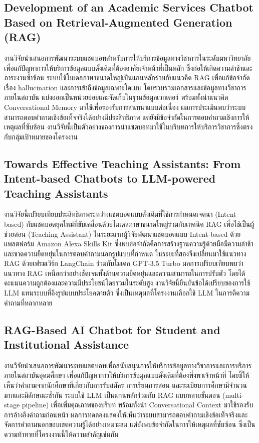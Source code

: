 \subsection{Development of an Academic Services Chatbot Based on Retrieval-Augmented Generation (RAG) \cite{academicChatbotRAG}}

งานวิจัยนำเสนอการพัฒนาระบบแชตบอทสำหรับการให้บริการข้อมูลทางวิชาการในระดับมหาวิทยาลัย เพื่อแก้ปัญหาการให้บริการข้อมูลแบบดั้งเดิมที่ต้องอาศัยเจ้าหน้าที่เป็นหลัก ซึ่งก่อให้เกิดความล่าช้าและภาระงานซ้ำซ้อน ระบบใช้โมเดลภาษาขนาดใหญ่เป็นแกนหลักร่วมกับแนวคิด RAG เพื่อแก้ข้อจำกัดเรื่อง hallucination และการเข้าถึงข้อมูลเฉพาะโดเมน โดยรวบรวมเอกสารและข้อมูลทางวิชาการภายในสถาบัน แบ่งออกเป็นหน่วยย่อยและจัดเก็บในฐานข้อมูลเวกเตอร์ พร้อมทั้งนำแนวคิด Conversational Memory มาใช้เพื่อรองรับการสนทนาแบบต่อเนื่อง ผลการประเมินพบว่าระบบสามารถตอบคำถามเชิงข้อเท็จจริงได้อย่างมีประสิทธิภาพ แต่ยังมีข้อจำกัดในการตอบคำถามเชิงการให้เหตุผลที่ซับซ้อน งานวิจัยนี้เป็นตัวอย่างของการนำแชตบอทมาใช้ในบริบทการให้บริการวิชาการซึ่งตรงกับกลุ่มเป้าหมายของโครงงาน

\subsection{Towards Effective Teaching Assistants: From Intent-based Chatbots to LLM-powered Teaching Assistants \cite{teachingAssistantsLLM}}

งานวิจัยนี้เปรียบเทียบประสิทธิภาพระหว่างแชตบอตแบบดั้งเดิมที่ใช้การกำหนดเจตนา (Intent-based) กับแชตบอตยุคใหม่ที่ขับเคลื่อนด้วยโมเดลภาษาขนาดใหญ่ร่วมกับเทคนิค RAG เพื่อใช้เป็นผู้ช่วยสอน (Teaching Assistant) ในระยะแรกผู้วิจัยพัฒนาแชตบอตแบบ Intent-based ด้วยแพลตฟอร์ม Amazon Alexa Skills Kit ซึ่งพบข้อจำกัดคือการสร้างฐานความรู้ด้วยมือมีความล่าช้าและขาดความยืดหยุ่นในการตอบคำถามนอกรูปแบบที่กำหนด ในระยะที่สองจึงเปลี่ยนมาใช้แนวทาง RAG ด้วยเฟรมเวิร์ก LangChain ร่วมกับโมเดล GPT-3.5 Turbo ผลการเปรียบเทียบพบว่าแนวทาง RAG เหนือกว่าอย่างชัดเจนทั้งด้านความยืดหยุ่นและความสามารถในการปรับตัว โดยได้คะแนนความถูกต้องและความมีประโยชน์โดยรวมในระดับสูง งานวิจัยนี้ยืนยันข้อได้เปรียบของการใช้ LLM แทนระบบที่อิงรูปแบบประโยคตายตัว ซึ่งเป็นเหตุผลที่โครงงานเลือกใช้ LLM ในการตีความคำถามที่หลากหลาย

\subsection{RAG-Based AI Chatbot for Student and Institutional Assistance \cite{ragStudentInstitutional}}

งานวิจัยนำเสนอการพัฒนาระบบแชตบอทเพื่อสนับสนุนการให้บริการข้อมูลทางวิชาการและการบริการภายในสถาบันอุดมศึกษา เพื่อแก้ปัญหาการให้บริการข้อมูลแบบดั้งเดิมที่ต้องพึ่งพาเจ้าหน้าที่ โดยชี้ให้เห็นว่าคำถามจากนักศึกษาที่เกี่ยวกับการรับสมัคร การเรียนการสอน และระเบียบการศึกษามีจำนวนมากและมีลักษณะซ้ำกัน ระบบใช้ LLM เป็นแกนหลักร่วมกับ RAG แบบหลายขั้นตอน (multi-stage pipeline) เพื่อเพิ่มคุณภาพของบริบท พร้อมทั้งนำ Conversational Context มาใช้รองรับการอ้างอิงคำถามก่อนหน้า ผลการทดลองแสดงให้เห็นว่าระบบสามารถตอบคำถามเชิงข้อเท็จจริงและจัดการคำถามนอกขอบเขตความรู้ได้อย่างเหมาะสม แต่ยังพบข้อจำกัดในการให้เหตุผลที่ซับซ้อน ซึ่งเป็นความท้าทายที่โครงงานนี้ให้ความสำคัญเช่นกัน

